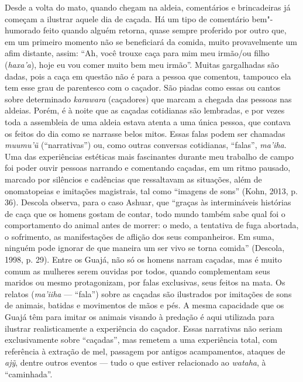 Desde a volta do mato, quando chegam na aldeia, comentários e
brincadeiras já começam a ilustrar aquele dia de caçada. Há um tipo de
comentário bem"-humorado feito quando alguém retorna, quase sempre
proferido por outro que, em um primeiro momento não se beneficiará da
comida, muito provavelmente um afim distante, assim: ``Ah, você trouxe
caça para mim meu irmão/ou filho (\emph{haxa'a}), hoje eu vou comer
muito bem meu irmão''. Muitas gargalhadas são dadas, pois a caça em
questão não é para a pessoa que comentou, tampouco ela tem esse grau de
parentesco com o caçador. São piadas como essas ou cantos sobre
determinado \emph{karawara} (caçadores) que marcam a chegada das pessoas
nas aldeias. Porém, é à noite que as caçadas cotidianas são lembradas, e
por vezes toda a assembleia de uma aldeia estava atenta a uma única
pessoa, que contava os feitos do dia como se narrasse belos mitos. Essas
falas podem ser chamadas \emph{muumu'ũ} (``narrativas'') ou, como outras
conversas cotidianas, ``falas'', \emph{ma'iha}. Uma das experiências
estéticas mais fascinantes durante meu trabalho de campo foi poder ouvir
pessoas narrando e comentando caçadas, em um ritmo pausado, marcado por
silêncios e cadências que ressaltavam as situações, além de onomatopeias
e imitações magistrais, tal como ``imagens de sons'' (Kohn, 2013, p. 36).
Descola observa, para o caso Ashuar, que ``graças às intermináveis
histórias de caça que os homens gostam de contar, todo mundo também sabe
qual foi o comportamento do animal antes de morrer: o medo, a tentativa
de fuga abortada, o sofrimento, as manifestações de aflição dos seus
companheiros. Em suma, ninguém pode ignorar de que maneira um ser vivo
se torna comida'' (Descola, 1998, p. 29). Entre os Guajá, não só os
homens narram caçadas, mas é muito comum as mulheres serem ouvidas por
todos, quando complementam seus maridos ou mesmo protagonizam, por falas
exclusivas, seus feitos na mata. Os relatos (\emph{ma'iiha} --- ``fala'')
sobre as caçadas são ilustrados por imitações de sons de animais,
batidas e movimentos de mãos e pés. A mesma capacidade que os Guajá têm
para imitar os animais visando à predação é aqui utilizada para ilustrar
realisticamente a experiência do caçador. Essas narrativas não seriam
exclusivamente sobre ``caçadas'', mas remetem a uma experiência total, com
referência à extração de mel, passagem por antigos acampamentos, ataques
de \emph{ajỹ}, dentre outros eventos --- tudo o que estiver relacionado ao
\emph{wataha}, à ``caminhada''.

